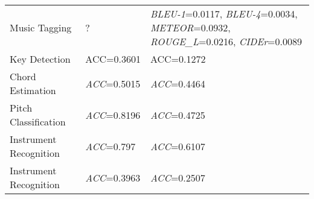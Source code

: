 \begin{longtable}[hbtp]{p{4.6cm}<{\raggedright}p{4.5cm}<{\raggedright}p{4.5cm}<{\raggedright}}
    Music Tagging & ? & \textit{BLEU-1}=0.0117, \textit{BLEU-4}=0.0034, \textit{METEOR}=0.0932, \textit{ROUGE\_L}=0.0216, \textit{CIDEr}=0.0089 \\ %
    Key Detection & ACC=0.3601 & ACC=0.1272 \\
    Chord Estimation & \textit{ACC}=0.5015 & \textit{ACC}=0.4464\\
    Pitch Classification & \textit{ACC}=0.8196 & \textit{ACC}=0.4725 \\ %
    Instrument Recognition & \textit{ACC}=0.797 & \textit{ACC}=0.6107\\ %
    Instrument Recognition & \textit{ACC}=0.3963 & \textit{ACC}=0.2507\\ %
    
       
    


\end{longtable}
